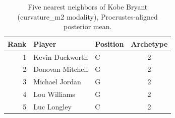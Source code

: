 \begin{table}[htbp]
  \centering\small
  \begin{tabular}{rllc}
    \toprule
    Rank & Player & Position & Archetype \\
    \midrule
    1 & Kevin Duckworth & C & 2 \\
    2 & Donovan Mitchell & G & 2 \\
    3 & Michael Jordan & G & 2 \\
    4 & Lou Williams & G & 2 \\
    5 & Luc Longley & C & 2 \\
    \bottomrule
  \end{tabular}
  \caption{Five nearest neighbors of Kobe Bryant (curvature_m2 modality), Procrustes-aligned posterior mean.}
  \label{tab:Kobe_Bryant_neighbors_curvature_m2}
\end{table}


